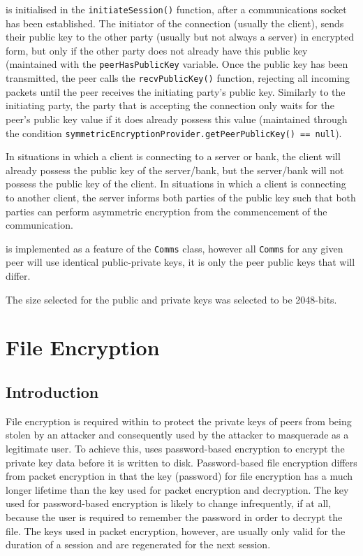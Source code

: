 \documentclass[a4paper,11pt]{article}
\begin{document}
 is initialised in the \verb+initiateSession()+ 
function, after a communications socket has been established. The initiator of 
the connection (usually the client), sends their public key to the other party 
(usually but not always a server) in encrypted form, but only if the other party
does not already have this public key (maintained with the 
\verb+peerHasPublicKey+ variable. Once the public key has been transmitted, the 
\serviceName{} peer calls the \verb+recvPublicKey()+ function, rejecting all 
incoming packets until the peer receives the initiating party's public key. 
Similarly to the initiating party, the party that is accepting the connection 
only waits for the peer's public key value if it does already possess this value
(maintained through the condition 
\verb+symmetricEncryptionProvider.getPeerPublicKey() == null+).

In situations in which a client is connecting to a \serviceName{} server or 
bank, the client will already possess the public key of the server/bank, but the
server/bank will not possess the public key of the client. In situations in 
which a client is connecting to another client, the server informs both parties 
of the public key such that both parties can perform asymmetric encryption from 
the commencement of the communication.

 is implemented as a feature of the \serviceName{} 
\verb+Comms+ class, however all \verb+Comms+ for any given \serviceName{} peer 
will use identical public-private keys, it is only the peer public keys that 
will differ.

The size selected for the public and private keys was selected to be 2048-bits.
 
\section{File Encryption}

\subsection{Introduction}
File encryption is required within \packageName{} to protect the private keys of
\serviceName{} peers from being stolen by an attacker and consequently used by 
the attacker to masquerade as a legitimate user. To achieve this, \packageName{}
uses password-based encryption to encrypt the private key data before it is 
written to disk. Password-based file encryption differs from \packageName{} 
packet encryption in that the key (password) for file encryption has a much 
longer lifetime than the key used for packet encryption and decryption. The key 
used for password-based encryption is likely to change infrequently, if at all, 
because the user is required to remember the password in order to decrypt the 
file. The keys used in packet encryption, however, are usually only valid for 
the duration of a session and are regenerated for the next session.
\end{document}
